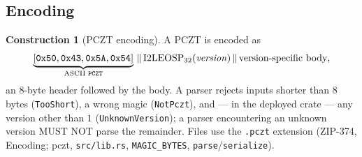 \documentclass[11pt,a4paper]{article}
\theoremstyle{definition}
\newtheorem{construction}[theorem]{Construction}
\begin{document}
\subsection{Encoding}\label{sec:pczt-encoding}

\begin{construction}[PCZT encoding]\label{def:pczt-encoding}
A PCZT is encoded as
\[
\underbrace{[\mathtt{0x50}, \mathtt{0x43}, \mathtt{0x5A},
\mathtt{0x54}]}_{\text{ASCII \texttt{PCZT}}}
\,\|\, \mathrm{I2LEOSP}_{32}(\mathit{version})
\,\|\, \text{version-specific body},
\]
an $8$-byte header followed by the body. A parser rejects inputs shorter
than $8$ bytes (\texttt{TooShort}), a wrong magic (\texttt{NotPczt}), and
--- in the deployed crate --- any version other than $1$
(\texttt{UnknownVersion}); a parser encountering an unknown version MUST
NOT parse the remainder. Files use the \texttt{.pczt} extension (ZIP-374,
Encoding; \textsf{pczt}, \texttt{src/lib.rs}, \texttt{MAGIC\_BYTES},
\texttt{parse}/\texttt{serialize}).


\end{construction}
\end{document}
